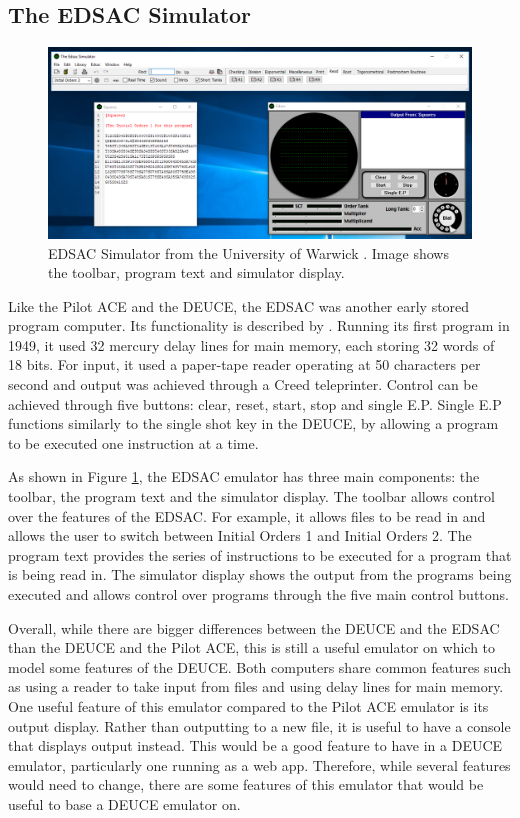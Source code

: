 \documentclass{l4proj}
\begin{document}
\subsection{The EDSAC Simulator}
\begin{figure}[h!]
	\centering
	\includegraphics[width=\linewidth]{images/edsac-emu}
	\caption{EDSAC Simulator from the University of Warwick \citep{Warwick16}. Image shows the toolbar, program text and simulator display.}
	\label{fig:edsac}
\end{figure}

Like the Pilot ACE and the DEUCE, the EDSAC was another early stored program computer. Its functionality is described by \citet{Edsac11}. Running its first program in 1949, it used 32 mercury delay lines for main memory, each storing 32 words of 18 bits. For input, it used a paper-tape reader operating at 50 characters per second and output was achieved through a Creed teleprinter. Control can be achieved through five buttons: clear, reset, start, stop and single E.P. Single E.P functions similarly to the single shot key in the DEUCE, by allowing a program to be executed one instruction at a time. 

As shown in Figure \ref{fig:edsac}, the EDSAC emulator has three main components: the toolbar, the program text and the simulator display. The toolbar allows control over the features of the EDSAC. For example, it allows files to be read in and allows the user to switch between Initial Orders 1 and Initial Orders 2. The program text provides the series of instructions to be executed for a program that is being read in. The simulator display shows the output from the programs being executed and allows control over programs through the five main control buttons.

Overall, while there are bigger differences between the DEUCE and the EDSAC than the DEUCE and the Pilot ACE, this is still a useful emulator on which to model some features of the DEUCE. Both computers share common features such as using a reader to take input from files and using delay lines for main memory. One useful feature of this emulator compared to the Pilot ACE emulator is its output display. Rather than outputting to a new file, it is useful to have a console that displays output instead. This would be a good feature to have in a DEUCE emulator, particularly one running as a web app. Therefore, while several features would need to change, there are some features of this emulator that would be useful to base a DEUCE emulator on.
\end{document}

